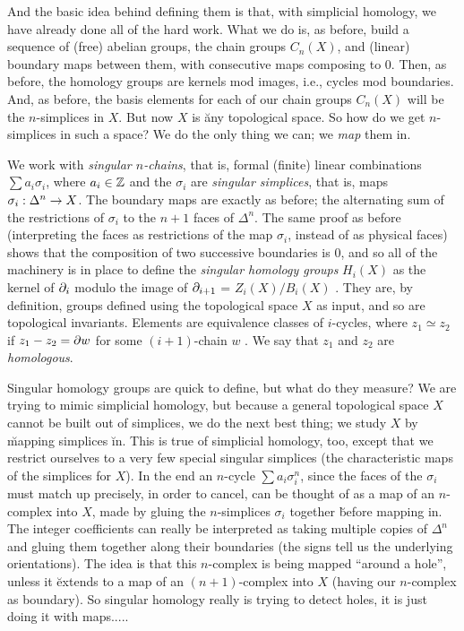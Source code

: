 \msk

And the basic idea behind defining them is that, with simplicial homology,
we have already done all of the hard work. What we do is, as before, build a 
sequence of (free) abelian groups, the chain groups $C_n(X)$, 
and (linear) boundary maps between them,
with consecutive maps composing to 0. Then, as before, the homology groups are
kernels mod images, i.e., cycles mod boundaries. And, as before, the basis
elements for each of our chain groups $C_n(X)$ will be the $n$-simplices
in $X$. But now $X$ is \u{any} topological space. So how do we get $n$-simplices
in such a space? We do the only thing we can; we {\it map} them in. 

\vfill
\eject

We work with {\it singular $n$-chains}, that is,
formal (finite) linear combinations $\sum a_i\sigma_i$, where $a_i\in{\Bbb Z}$
and the $\sigma_i$ are {\it singular simplices}, that is,
maps $\sigma_i:\Delta^n\rightarrow X$.
The boundary maps are exactly as before; the alternating sum of
the restrictions of $\sigma_i$ to the $n+1$ faces of $\Delta^n$. 
The same proof as before (interpreting
the faces as restrictions of the map $\sigma_i$, instead of as physical faces)
shows that the composition of two successive boundaries is 0,
and so all of the machinery is in place to define the {\it singular homology
groups} $H_i(X)$ as the kernel of $\partial_i$ modulo the image of $\partial_{i+1}$ = $Z_i(X)/B_i(X)$ .
They are, by definition, groups defined using the topological space $X$ as input,
and so are topological invariants. Elements are equivalence classes of $i$-cycles,
where $z_1\simeq z_2$ if $z_1-z_2=\partial w$ for some $(i+1)$-chain $w$ . We say that $z_1$ and $z_2$ are
{\it homologous}.

\msk

Singular homology groups are quick to define, but what do they measure?
We are trying to mimic simplicial homology, but because a
general topological space $X$ cannot be built out of simplices,
we do the next best thing; we study $X$ by \u{mapping} simplices \u{in}. 
This is true of simplicial homology, too, except that we restrict
ourselves to a very few special singular simplices (the characteristic maps of the
simplices for $X$). In the end an $n$-cycle $\sum a_i\sigma_i^n$, since the 
faces of the $\sigma_i$ must match up precisely, in order to cancel, 
can be thought of as a map of an $n$-complex into $X$, made by gluing the
$n$-simplices $\sigma_i$ together \u{before} mapping in. 
The integer coefficients can really be interpreted as taking multiple copies of 
$\Delta^n$ and gluing them together along their boundaries (the signs tell us
the underlying orientations). The idea is that this $n$-complex is being
mapped ``around a hole'', unless it \u{extends} to a map of an $(n+1)$-complex
into $X$ (having our $n$-complex as boundary). So singular homology really
is trying to detect holes, it is just doing it with maps.....

